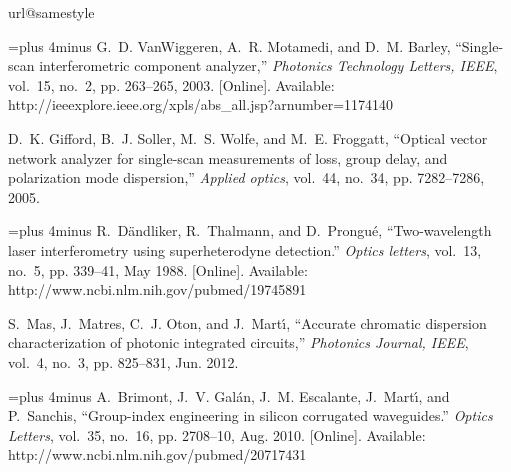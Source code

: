 \begin{thebibliography}{10}
\providecommand{\url}[1]{#1}
\csname url@samestyle\endcsname
\providecommand{\newblock}{\relax}
\providecommand{\bibinfo}[2]{#2}
\providecommand{\BIBentrySTDinterwordspacing}{\spaceskip=0pt\relax}
\providecommand{\BIBentryALTinterwordstretchfactor}{4}
\providecommand{\BIBentryALTinterwordspacing}{\spaceskip=\fontdimen2\font plus
\BIBentryALTinterwordstretchfactor\fontdimen3\font minus
  \fontdimen4\font\relax}
\providecommand{\BIBforeignlanguage}[2]{{%
\expandafter\ifx\csname l@#1\endcsname\relax
\typeout{** WARNING: IEEEtran.bst: No hyphenation pattern has been}%
\typeout{** loaded for the language `#1'. Using the pattern for}%
\typeout{** the default language instead.}%
\else
\language=\csname l@#1\endcsname
\fi
#2}}
\providecommand{\BIBdecl}{\relax}
\BIBdecl

\BIBentryALTinterwordspacing
G.~D. VanWiggeren, A.~R. Motamedi, and D.~M. Barley, ``{Single-scan
  interferometric component analyzer},'' \emph{Photonics Technology Letters,
  IEEE}, vol.~15, no.~2, pp. 263--265, 2003. [Online]. Available:
  \url{http://ieeexplore.ieee.org/xpls/abs\_all.jsp?arnumber=1174140}
\BIBentrySTDinterwordspacing

D.~K. Gifford, B.~J. Soller, M.~S. Wolfe, and M.~E. Froggatt, ``{Optical vector
  network analyzer for single-scan measurements of loss, group delay, and
  polarization mode dispersion},'' \emph{Applied optics}, vol.~44, no.~34, pp.
  7282--7286, 2005.

\BIBentryALTinterwordspacing
R.~D\"{a}ndliker, R.~Thalmann, and D.~Prongu\'{e}, ``{Two-wavelength laser
  interferometry using superheterodyne detection.}'' \emph{Optics letters},
  vol.~13, no.~5, pp. 339--41, May 1988. [Online]. Available:
  \url{http://www.ncbi.nlm.nih.gov/pubmed/19745891}
\BIBentrySTDinterwordspacing

S.~Mas, J.~Matres, C.~J. Oton, and J.~Mart\'{\i}, ``{Accurate chromatic
  dispersion characterization of photonic integrated circuits},''
  \emph{Photonics Journal, IEEE}, vol.~4, no.~3, pp. 825--831, Jun. 2012.

\BIBentryALTinterwordspacing
A.~Brimont, J.~V. Gal\'{a}n, J.~M. Escalante, J.~Mart\'{\i}, and P.~Sanchis,
  ``{Group-index engineering in silicon corrugated waveguides.}'' \emph{Optics
  Letters}, vol.~35, no.~16, pp. 2708--10, Aug. 2010. [Online]. Available:
  \url{http://www.ncbi.nlm.nih.gov/pubmed/20717431}
\BIBentrySTDinterwordspacing


\end{thebibliography}
